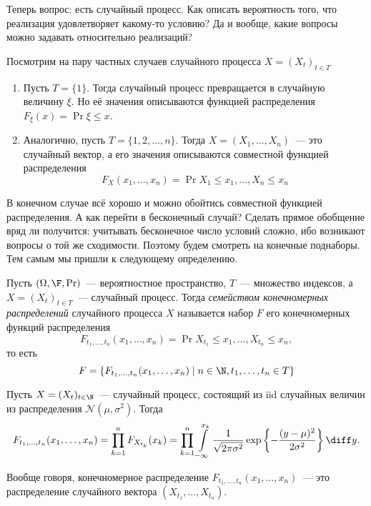 Теперь вопрос: есть случайный процесс. Как описать вероятность того, что 
реализация удовлетворяет какому-то условию? Да и вообще, какие вопросы можно 
задавать относительно реализаций? 

Посмотрим на пару частных случаев случайного процесса \(X = (X_{t})_{t \in T}\)
\begin{enumerate}
	\item Пусть \(T = \{1\}\). Тогда случайный процесс превращается в случайную 
	величину \(\xi\). Но её значения описываются функцией распределения 
	\(F_{\xi}(x) = \Pr{\xi \leq x}\).
	\item Аналогично, пусть \(T = \{1, 2, \dots, n\}\). Тогда \(X = (X_{1}, 
	\dots, X_{n})\)~--- это случайный вектор, а его значения описываются 
	совместной функцией распределения 
	\[
		F_{X}(x_{1}, \dots, x_{n}) = \Pr{X_{1} \leq x_{1}, \dots, X_{n} \leq 
		x_{n}}
	\]
\end{enumerate}

В конечном случае всё хорошо и можно обойтись совместной функцией 
распределения. А как перейти в бесконечный случай? Сделать прямое обобщение 
вряд ли получится: учитывать бесконечное число условий сложно, ибо возникают 
вопросы о той же сходимости. Поэтому будем смотреть на конечные поднаборы. Тем 
самым мы пришли к следующему определению.
\begin{definition}
	Пусть \((\Omega, \F, \Pr)\)~--- вероятностное пространство, \(T\)~--- 
	множество индексов, а \(X = (X_{t})_{t \in T}\)~--- случайный процесс. 
	Тогда \emph{семейством конечномерных распределений} случайного процесса 
	\(X\) называется набор \(F\) его конечномерных функций распределения
	\[
		F_{t_{1}, \dots, t_{n}}(x_{1}, \dots, x_{n}) = \Pr{X_{t_{1}} \leq 
		x_{1}, \ldots, X_{t_{n}} \leq x_{n}},
	\]
	то есть
	\[
		F = \{F_{t_{1}, \dots, t_{n}}(x_{1}, \dots, x_{n}) \mid n \in \N, 
		t_{1}, \dots, t_{n} \in T\}
	\]
\end{definition}

\begin{example}
	Пусть \(X = (X_{t})_{t \in \N}\)~--- случайный процесс, состоящий из iid 
	случайных величин из распределения \(\mathcal{N}(\mu, \sigma^{2})\). Тогда
	\[
		F_{t_{1}, \dots, t_{n}}(x_{1}, \dots, x_{n}) = \prod_{k = 1}^{n} 
		F_{X_{t_{k}}}(x_{k}) = \prod_{k = 1}^{n} \int\limits_{-\infty}^{x_{k}} 
		\frac{1}{\sqrt{2\pi\sigma^{2}}}\exp\left\{-\frac{(y - 
		\mu)^{2}}{2\sigma^{2}}\right\}\diff y.
	\]
\end{example}

Вообще говоря, конечномерное распределение \(F_{t_{1}, \dots, t_{n}}(x_{1}, 
\dots, x_{n})\)~--- это распределение случайного вектора \((X_{t_{1}}, \dots, 
X_{t_{n}})\).

